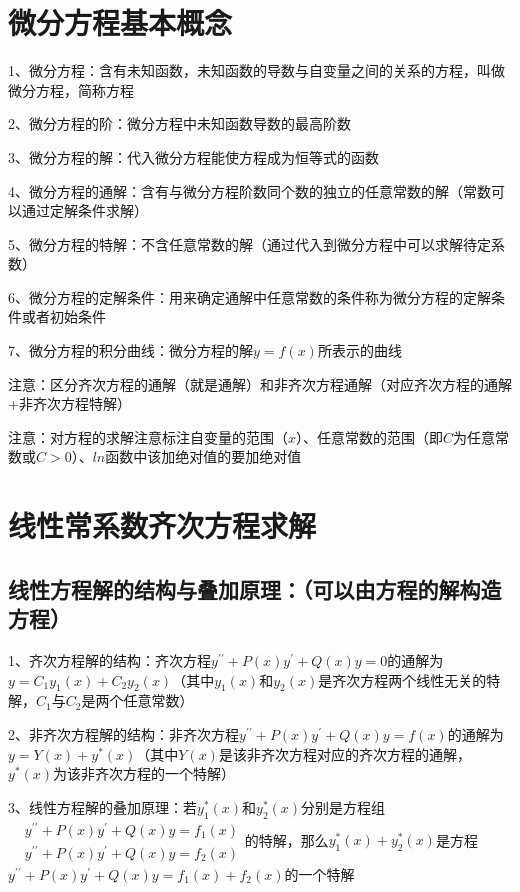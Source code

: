 \section{微分方程基本概念}

1、微分方程：含有未知函数，未知函数的导数与自变量之间的关系的方程，叫做微分方程，简称方程

2、微分方程的阶：微分方程中未知函数导数的最高阶数

3、微分方程的解：代入微分方程能使方程成为恒等式的函数

4、微分方程的通解：含有与微分方程阶数同个数的独立的任意常数的解（常数可以通过定解条件求解）

5、微分方程的特解：不含任意常数的解（通过代入到微分方程中可以求解待定系数）

6、微分方程的定解条件：用来确定通解中任意常数的条件称为微分方程的定解条件或者初始条件

7、微分方程的积分曲线：微分方程的解$y=f(x)$所表示的曲线

注意：区分齐次方程的通解（就是通解）和非齐次方程通解（对应齐次方程的通解+非齐次方程特解）

注意：对方程的求解注意标注自变量的范围（$x$）、任意常数的范围（即$C$为任意常数或$C>0$）、$ln$函数中该加绝对值的要加绝对值

\section{线性常系数齐次方程求解}



\subsection{线性方程解的结构与叠加原理：（可以由方程的解构造方程）}

1、齐次方程解的结构：齐次方程$y^{\prime \prime}+P(x) y^{\prime}+Q(x) y=0$的通解为$y=C_{1} y_{1}(x)+C_{2} y_{2}(x)$（其中$y_{1}(x)$和$y_{2}(x)$是齐次方程两个线性无关的特解，$C_{1}$与$C_{2}$是两个任意常数）

2、非齐次方程解的结构：非齐次方程$y^{\prime \prime}+P(x) y^{\prime}+Q(x) y=f(x)$的通解为$y=Y(x)+y^{*}(x)$（其中$Y(x)$是该非齐次方程对应的齐次方程的通解，$y^{*}(x)$为该非齐次方程的一个特解）

3、线性方程解的叠加原理：若$y_{1}^{*}(x)$和$y_{2}^{*}(x)$分别是方程组$\begin{aligned} &y^{\prime \prime}+P(x) y^{\prime}+Q(x) y=f_{1}(x) \\ &y^{\prime \prime}+P(x) y^{\prime}+Q(x) y=f_{2}(x) \end{aligned}$的特解，那么$y_{1}^{*}(x)+y_{2}^{*}(x)$是方程$y^{\prime \prime}+P(x) y^{\prime}+Q(x) y=f_{1}(x)+f_{2}(x)$的一个特解

